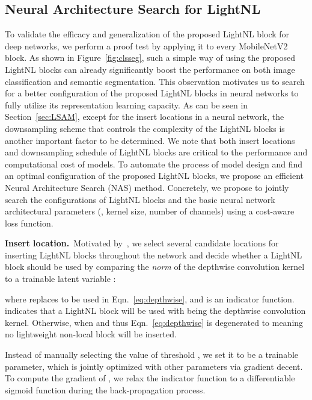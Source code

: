\documentclass[10pt,twocolumn,letterpaper]{article}
\begin{document}
\subsection{Neural Architecture Search for LightNL}
\label{sec:search}

To validate the efficacy and generalization of the proposed LightNL block for deep networks, we perform a proof test by applying it to every MobileNetV2 block. As shown in Figure~\ref{fig:clsseg}, such a simple way of using the proposed LightNL blocks can already significantly boost the performance on both image classification and semantic segmentation. This observation motivates us to search for a better configuration of the proposed LightNL blocks in neural networks to fully utilize its representation learning capacity.
As can be seen in Section~\ref{sec:LSAM}, except for the insert locations in a neural network, the downsampling scheme that controls the complexity of the LightNL blocks is another important factor to be determined. We note that both insert locations and downsampling schedule of LightNL blocks are critical to the performance and computational cost of models. To automate the process of model design and find an optimal configuration of the proposed LightNL blocks, we propose an efficient Neural Architecture Search (NAS) method.
Concretely, 
we propose to jointly search the configurations of LightNL blocks and the basic neural network architectural parameters (\eg, kernel size, number of channels) using a cost-aware loss function.


\vspace{0.5ex}\noindent\textbf{Insert location.}~Motivated by~\cite{stamoulis2019single}, we select several candidate locations for inserting LightNL blocks throughout the network and decide whether a LightNL block should be used 
by
comparing the \textit{ norm} of the depthwise convolution kernel  to a trainable latent variable :

where  replaces  to be used in Eqn.~\eqref{eq:depthwise}, and  is an indicator function.
 indicates that a LightNL block will be used  with  being the depthwise convolution kernel. Otherwise,  when  and thus Eqn.~\eqref{eq:depthwise} is degenerated to  meaning no lightweight non-local block will be inserted.

Instead of manually selecting the value of threshold , we set it to be a trainable parameter, which is jointly optimized with other parameters via gradient decent. To compute the gradient of , we relax the indicator function  to a differentiable sigmoid function  during the back-propagation process.
\end{document}

